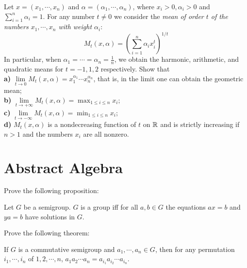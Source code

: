 \documentclass{article}
\newenvironment{problem}[2][Problem]{\begin{trivlist}
		\item[\hskip \labelsep {\bfseries #1}\hskip \labelsep {\bfseries #2.}]}{\end{trivlist}}
\begin{document}
\begin{problem}{5}
	Let $ x=(x_1,\cdots,x_n) $ and $ \alpha = (\alpha_1,\cdots,\alpha_n) $, where $ x_i >0,\alpha_i>0 $ and $ \sum_{i=1}^{n}\alpha_i=1 $. For any number $ t \neq 0 $ we consider the \textit{mean of order $ t $ of the numbers $ x_1,\cdots,x_n $ with weight $ \alpha_i $}:
	\begin{equation}
		M_t(x,\alpha) = (\sum_{i=1}^{n}\alpha_i x^t_i)^{1/t} \nonumber
	\end{equation} 
	In particular, when $ \alpha_1 = \cdots = \alpha_n = \frac{1}{n} $, we obtain the harmonic, arithmetic, and quadratic means for $ t=-1,1,2 $ respectively.\newpara
	Show that \\
	\textbf{a)} $ \lim\limits_{t \to 0}M_t(x,\alpha)=x_1^{\alpha_1}\cdots x_n^{\alpha_n} $, that is, in the limit one can obtain the geometric mean; \\
	\textbf{b)} $ \lim\limits_{t \to + \infty} M_t(x,\alpha)=\max_{1 \leqslant i \leqslant n}x_i$;\\
	\textbf{c)} $ \lim\limits_{t \to - \infty} M_t(x,\alpha)=\min_{1 \leqslant i \leqslant n}x_i$;\\
	\textbf{d)} $ M_t(x,\alpha) $ is a nondecreasing function of $ t $ on $ \mathbb{R} $ and is strictly increasing if $ n>1 $ and the numbers $ x_i $ are all nonzero.\\
	
\end{problem}	
	
	
\section{Abstract Algebra}	
\begin{problem}{1}
	Prove the following proposition:
	\begin{Proposition}
		Let $ G $ be a semigroup. $ G $ is a group iff for all $ a,b\in G $ the equations $ ax=b $ and $ ya=b $ have solutions in $ G $.
	\end{Proposition}
\end{problem}
\begin{problem}{2}
	Prove the following theorem:
	\begin{Theorem}
		If $ G $ is a commutative semigroup and $ a_1,\cdots,a_n \in G $, then for any permutation $ i_1,\cdots,i_n $ of $ 1,2,\cdots,n $, $ a_1 a_2 \cdots a_n = a_{i_1}a_{i_2}\cdots a_{i_n} $.
	\end{Theorem}
\end{problem}
	
\end{document}
